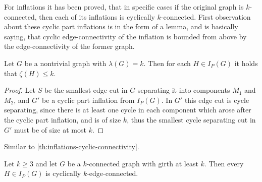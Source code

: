 \documentclass[12pt, twoside]{book}
\begin{document}
For inflations it has been proved, that in specific cases if the original graph is $k$-connected, then each of its inflations is cyclically $k$-connected. First observation about these cyclic part inflations is in the form of a lemma, and is basically saying, that cyclic edge-connectivity of the inflation is bounded from above by the edge-connectivity of the former graph.

\begin{lemma}
	Let $G$ be a nontrivial graph with $\lambda(G)=k$. Then for each $H\in I_P(G)$ it holds that $\zeta(H)\leq k$.
\end{lemma}

\begin{proof}
	Let $S$ be the smallest edge-cut in $G$ separating it into components $M_1$ and $M_2$, and $G'$ be a cyclic part inflation from $I_P(G)$. In $G'$ this edge cut is cycle separating, since there is at least one cycle in each component which arose after the cyclic part inflation, and is of size $k$, thus the smallest cycle separating cut in $G'$ must be of size at most $k$.
\end{proof}

Similar to \cref{th:inflations-cyclic-connectivity}.

\begin{theorem}
	Let $k\geq 3$ and let $G$ be a $k$-connected graph with girth at least $k$. Then every  $H\in I_P(G)$ is cyclically $k$-edge-connected.
\end{theorem}
\end{document}
